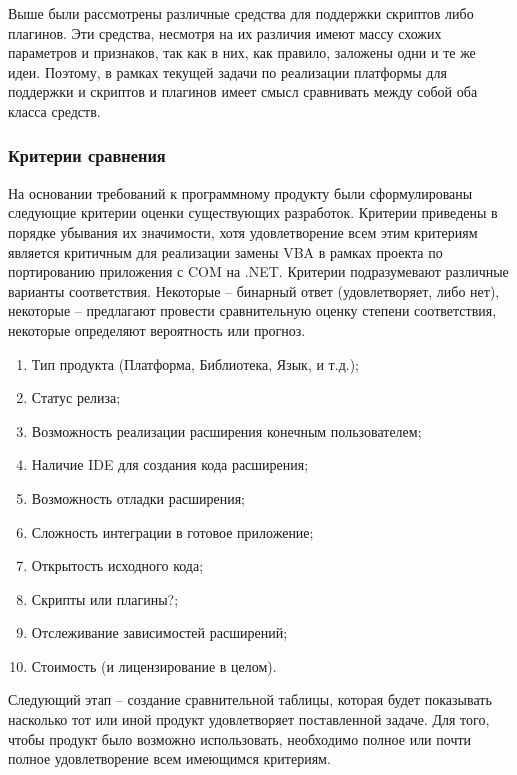Выше были рассмотрены различные средства для поддержки скриптов либо плагинов. Эти средства, несмотря на их различия имеют массу схожих параметров и признаков, так как в них, как правило, заложены одни и те же идеи. Поэтому, в рамках текущей задачи по реализации платформы для поддержки и скриптов и плагинов имеет смысл сравнивать между собой оба класса средств.

\subsubsection{Критерии сравнения}
На основании требований к программному продукту были сформулированы следующие критерии оценки существующих разработок. Критерии приведены в порядке убывания их значимости, хотя удовлетворение всем этим критериям является критичным для реализации замены VBA в рамках проекта по портированию приложения с COM на .NET. Критерии подразумевают различные варианты соответствия. Некоторые – бинарный ответ (удовлетворяет, либо нет), некоторые – предлагают провести сравнительную оценку степени соответствия, некоторые определяют вероятность или прогноз.

\begin{enumerate}
\item Тип продукта (Платформа, Библиотека, Язык, и т.д.);
\item Статус релиза;
\item Возможность реализации расширения конечным пользователем;
\item Наличие IDE для создания кода расширения;
\item Возможность отладки расширения;
\item Сложность интеграции в готовое приложение;
\item Открытость исходного кода;
\item Скрипты или плагины?;
\item Отслеживание зависимостей расширений;
\item Стоимость (и лицензирование в целом).
\end{enumerate}

Следующий этап – создание сравнительной таблицы, которая будет показывать насколько тот или иной продукт удовлетворяет поставленной задаче. Для того, чтобы продукт было возможно использовать, необходимо полное или почти полное удовлетворение всем имеющимся критериям.

\pagebreak

